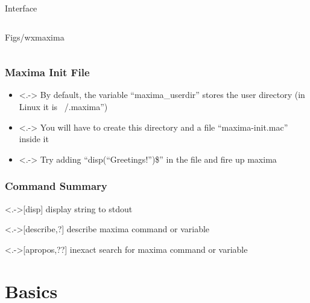 \documentclass[12pt,usenames,pdftex]{beamer}
\begin{document}
\begin{frame}[<1->]{Interface}
\begin{columns}
\begin{column}{0.65\linewidth}
\begin{center}
{          {Figs/wxmaxima}}
      \end{center}
    \end{column}  
  \end{columns}
\end{frame}

\begin{frame}
  \frametitle{Maxima Init File}
  \begin{itemize}
  \item<.-> By default, the variable ``maxima_userdir'' stores the
    user directory (in Linux it is ~/.maxima'')
  \item<.-> You will have to create this directory and a file
    ``maxima-init.mac'' inside it
  \item<.-> Try adding ``disp(``Greetings!'')\$'' in the file and fire
    up maxima
  \end{itemize}
\end{frame}

\begin{frame}
  \frametitle{Command Summary}
  \begin{description}
  \item<.->[disp] display string to stdout
  \item<.->[describe,?] describe maxima command or variable
  \item<.->[apropos,??] inexact search for maxima command or variable
  \end{description}
\end{frame}

\section{Basics}
\end{document}

